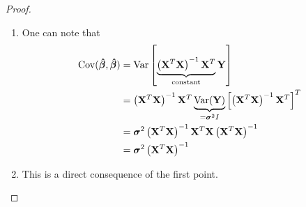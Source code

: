 \begin{proof}
    \begin{enumerate}[label=(\roman*)]
        \item One can note that\begin{align*}
                  \operatorname{Cov}(\boldsymbol{\hat{\beta}}, \boldsymbol{\hat{\beta}})
                   & = \operatorname{Var} \left[ \underbrace{\left(\mathbf{X}^T \mathbf{X}\right)^{-1} \mathbf{X}^T}_{\text{constant}} \mathbf{Y}\right]                               \\
                   & = \left(\mathbf{X}^T \mathbf{X}\right)^{-1} \mathbf{X}^T \underbrace{\operatorname{Var}(\mathbf{Y})}_{= \boldsymbol{\sigma}^2 I} \left[\left( \mathbf{X}^T \mathbf{X} \right)^{-1} \mathbf{X}^T\right]^T \\
                   & = \boldsymbol{\sigma}^{2}\left(\mathbf{X}^T \mathbf{X}\right)^{-1} \mathbf{X}^T \mathbf{X}\left(\mathbf{X}^T \mathbf{X}\right)^{-1}                                                \\
                   & = \boldsymbol{\sigma}^{2}\left(\mathbf{X}^T \mathbf{X}\right)^{-1}
              \end{align*}
        \item This is a direct consequence of the first point.
    \end{enumerate}
\end{proof}

